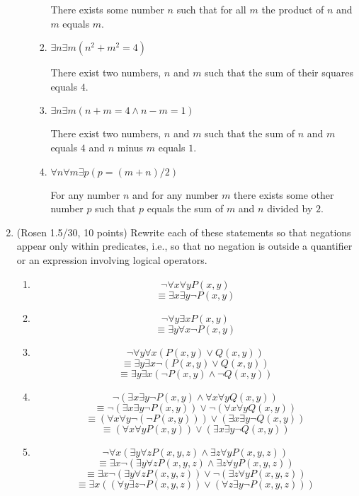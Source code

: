 \documentclass[11pt]{article}
\begin{document}
\begin{enumerate}
\begin{enumerate}
\begin{enumerate}
There exists some number $n$ such that for all $m$ the product of $n$ and $m$ equals $m$.  

\item $\exists n\exists m (n^2+m^2 = 4)$

There exist two numbers, $n$ and $m$ such that the sum of their squares equals $4$.  

\item $\exists n\exists m (n+m = 4 \land n-m=1)$

There exist two numbers, $n$ and $m$ such that the sum of $n$ and $m$ equals $4$ and $n$ minus $m$ equals $1$.  

\item $\forall n\forall m \exists p(p = (m+n)/2)$

For any number $n$ and for any number $m$ there exists some other number $p$ such that $p$ equals the sum of $m$ and $n$ divided by $2$.  

\end{enumerate}
\end{enumerate}

\newpage

\item (Rosen 1.5/30, 10 points) Rewrite each of these statements so that negations appear only within predicates, i.e., so that no negation is outside a quantifier or an expression involving logical operators.
\begin{enumerate}
\item 
$$\lnot\forall x \forall y P(x,y)$$
$$ \equiv \exists x \exists y \lnot P(x,y) $$

\item 
$$\lnot\forall y \exists x P(x,y)$$
$$ \equiv \exists y \forall x \lnot P(x,y) $$

\item 
$$\lnot\forall y \forall x (P(x,y) \lor Q(x,y))$$
$$ \equiv \exists y \exists x \lnot (P(x,y) \lor Q(x,y)) $$
$$ \equiv \exists y \exists x (\lnot P(x,y) \land \lnot Q(x,y)) $$

\item 
$$\lnot(\exists x\exists y\lnot P(x,y) \land \forall x\forall y Q(x,y))$$
$$ \equiv \lnot (\exists x \exists y \lnot P(x,y)) \lor \lnot (\forall x \forall y Q(x,y))$$
$$ \equiv (\forall x \forall y \lnot (\lnot P(x,y))) \lor (\exists x \exists y \lnot Q(x,y)) $$
$$ \equiv (\forall x \forall y P(x,y)) \lor (\exists x \exists y \lnot Q(x,y)) $$

\item 
$$\lnot\forall x(\exists y \forall z P(x,y,z) 
                        \land \exists z\forall y P(x,y,z))$$
$$ \equiv \exists x \lnot (\exists y \forall z P(x,y,z) \land \exists z \forall y P(x,y,z)) $$
$$ \equiv \exists x \lnot (\exists y \forall z P(x,y,z)) \lor \lnot (\exists z \forall y P(x,y,z))$$
$$ \equiv \exists x ((\forall y \exists z \lnot P(x,y,z)) \lor (\forall z \exists y \lnot P(x,y,z)))$$
                        
\end{enumerate}

\end{enumerate}
\end{document}
